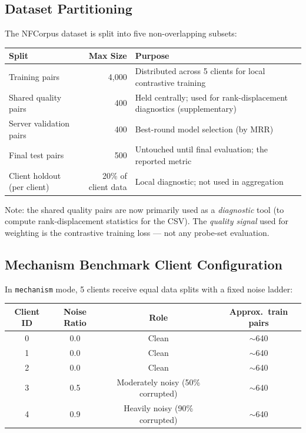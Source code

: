\documentclass[12pt,a4paper]{article}
\begin{document}
\subsection{Dataset Partitioning}

The NFCorpus dataset is split into five non-overlapping subsets:

\begin{center}
\renewcommand{\arraystretch}{1.4}
\begin{tabular}{lrp{7cm}}
\toprule
\textbf{Split} & \textbf{Max Size} & \textbf{Purpose} \\
\midrule
Training pairs & 4,000 & Distributed across 5 clients for local contrastive training \\
Shared quality pairs & 400 & Held centrally; used for rank-displacement diagnostics (supplementary) \\
Server validation pairs & 400 & Best-round model selection (by MRR) \\
Final test pairs & 500 & Untouched until final evaluation; the reported metric \\
Client holdout (per client) & 20\% of client data & Local diagnostic; not used in aggregation \\
\bottomrule
\end{tabular}
\end{center}

Note: the shared quality pairs are now primarily used as a \textit{diagnostic} tool (to compute rank-displacement statistics for the CSV). The \textit{quality signal} used for weighting is the contrastive training loss --- not any probe-set evaluation.

\subsection{Mechanism Benchmark Client Configuration}

In \texttt{mechanism} mode, 5 clients receive equal data splits with a fixed noise ladder:

\begin{center}
\renewcommand{\arraystretch}{1.4}
\begin{tabular}{cccc}
\toprule
\textbf{Client ID} & \textbf{Noise Ratio} & \textbf{Role} & \textbf{Approx.\ train pairs} \\
\midrule
0 & 0.0 & Clean & $\sim$640 \\
1 & 0.0 & Clean & $\sim$640 \\
2 & 0.0 & Clean & $\sim$640 \\
3 & 0.5 & Moderately noisy (50\% corrupted) & $\sim$640 \\
4 & 0.9 & Heavily noisy (90\% corrupted) & $\sim$640 \\
\bottomrule
\end{tabular}
\end{center}
\end{document}
